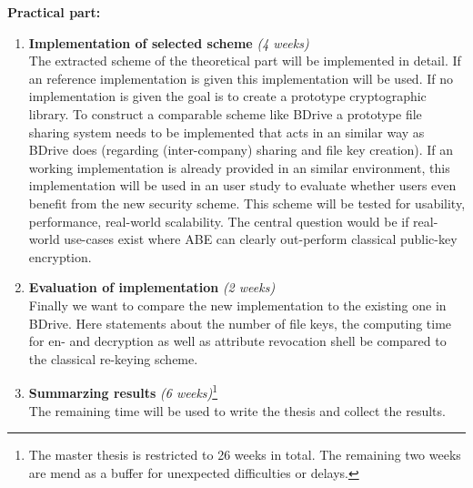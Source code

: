 \documentclass[twocolumn]{article}
\begin{document}
\noindent \textbf{Practical part:}
\begin{enumerate}
	\item\textbf{Implementation of selected scheme} \textit{(4 weeks)}\\
		  The extracted scheme of the theoretical part will be implemented in detail. If an reference implementation is given this implementation will be used. If no implementation is given the goal is to create a prototype cryptographic library. To construct a comparable scheme like BDrive a prototype file sharing system needs to be implemented that acts in an similar way as BDrive does (regarding (inter-company) sharing and file key creation). 
		  If an working implementation is already provided in an similar environment, this implementation will be used in an user study to evaluate whether users even benefit from the new security scheme. This scheme will be tested for usability, performance, real-world scalability. The central question would be if real-world use-cases exist where ABE can clearly out-perform classical public-key encryption.

	\item\textbf{Evaluation of implementation} \textit{(2 weeks)}\\
		  Finally we want to compare the new implementation to the existing one in BDrive. Here statements about the number of file keys, the computing time for en- and decryption as well as attribute revocation shell be compared to the classical re-keying scheme.
		  
	\item\textbf{Summarzing results} \textit{(6 weeks)}\footnote{The master thesis is restricted to 26 weeks in total. The remaining two weeks are mend as a buffer for unexpected difficulties or delays.}\\
		  The remaining time will be used to write the thesis and collect the results.   
\end{enumerate}
\end{document}
